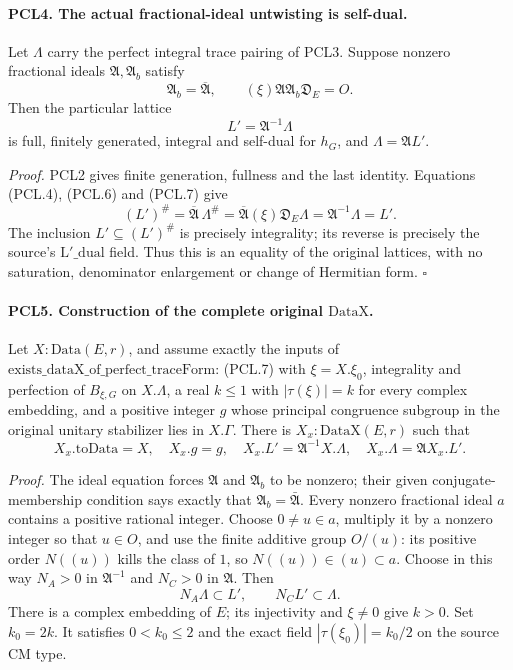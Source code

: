 \documentclass[11pt,a4paper]{article}
\numberwithin{equation}{section}
\theoremstyle{remark}\newtheorem{remark}[theorem]{Remark}
\begin{document}
\paragraph{PCL4. The actual fractional-ideal untwisting is self-dual.}
\label{claim:PCL4}
Let \(\Lambda\) carry the perfect integral trace pairing
of PCL3.  Suppose nonzero fractional ideals
\(\mathfrak A,\mathfrak A_b\) satisfy
\[
 \mathfrak A_b=\overline{\mathfrak A},\qquad
             (\xi)\mathfrak A\mathfrak A_b\mathfrak D_E=O.
                                                               \tag{PCL.7}
\]
Then the particular lattice
\[
               L'=\mathfrak A^{-1}\Lambda            \tag{PCL.8}
\]
is full, finitely generated, integral and self-dual for
\(h_G\), and \(\Lambda=\mathfrak A L'\).

\emph{Proof.}
PCL2 gives finite generation, fullness and the last
identity.  Equations (PCL.4), (PCL.6) and (PCL.7) give
\[
 (L')^\#=\overline{\mathfrak A}\,\Lambda^\#
       =\overline{\mathfrak A}(\xi)\mathfrak D_E\Lambda
       =\mathfrak A^{-1}\Lambda=L'.                  \tag{PCL.9}
\]
The inclusion \(L'\subseteq(L')^\#\) is precisely
integrality; its reverse is precisely the source's
\(\mathrm{L'\_\allowbreak dual}\) field.  Thus this is an equality
of the original lattices, with no saturation, denominator
enlargement or change of Hermitian form.
\hfill\(\square\)

\paragraph{PCL5. Construction of the complete original \(\mathrm{DataX}\).}
\label{claim:PCL5}
Let \(X:\mathrm{Data}(E,r)\), and assume exactly the inputs
of \(\mathrm{exists\_\allowbreak dataX\_\allowbreak of\_\allowbreak perfect\_\allowbreak traceForm}\):
(PCL.7) with \(\xi=X.\xi_0\), integrality and perfection
of \(B_{\xi,G}\) on \(X.\Lambda\), a real \(k\le1\)
with \(|\tau(\xi)|=k\) for every complex embedding, and
a positive integer \(g\) whose principal congruence
subgroup in the original unitary stabilizer lies in
\(X.\Gamma\).  There is \(X_x:\mathrm{DataX}(E,r)\) such
that
\[
 X_x.\mathrm{toData}=X,\quad X_x.g=g,\quad
 X_x.L'=\mathfrak A^{-1}X.\Lambda,\quad
 X_x.\Lambda=\mathfrak A X_x.L'.                     \tag{PCL.10}
\]

\emph{Proof.}
The ideal equation forces \(\mathfrak A\) and
\(\mathfrak A_b\) to be nonzero; their given
conjugate-membership condition says exactly that
\(\mathfrak A_b=\bar{\mathfrak A}\).
Every nonzero fractional ideal \(a\) contains a
positive rational integer.  Choose \(0\ne u\in a\),
multiply it by a nonzero integer so that \(u\in O\), and
use the finite additive group \(O/(u)\): its positive
order \(N((u))\) kills the class of \(1\), so
\(N((u))\in(u)\subset a\).  Choose in this way
\(N_A>0\) in \(\mathfrak A^{-1}\) and \(N_C>0\) in
\(\mathfrak A\).  Then
\[
                N_A\Lambda\subset L',\qquad
                            N_C L'\subset\Lambda.    \tag{PCL.11}
\]
There is a complex embedding of \(E\); its injectivity
and \(\xi\ne0\) give \(k>0\).  Set \(k_0=2k\).
It satisfies \(0<k_0\le2\) and the exact field
\(|\tau(\xi_0)|=k_0/2\) on the source CM type.
\end{document}
